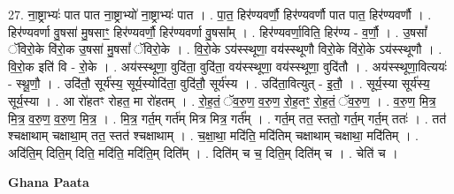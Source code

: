 \documentclass[17pt]{extarticle}
\begin{document}
27. ना॒ष्ट्राभ्यः॑ पात पात ना॒ष्ट्राभ्यो॑ ना॒ष्ट्राभ्यः॑ पात । . पा॒त॒ हिर॑ण्यवर्णौ॒ हिर॑ण्यवर्णौ पात पात॒ हिर॑ण्यवर्णौ । . हिर॑ण्यवर्णा वु॒षसा॑ मु॒षसाꣳ॒॒ हिर॑ण्यवर्णौ॒ हिर॑ण्यवर्णा वु॒षसा᳚म् । . हिर॑ण्यवर्णा॒विति॒ हिर॑ण्य - व॒र्णौ॒ । . उ॒षसां᳚ ॅविरो॒के वि॑रो॒क उ॒षसा॑ मु॒षसां᳚ ॅविरो॒के । . वि॒रो॒के ऽय॑स्स्थूणा॒ वय॑स्स्थूणौ विरो॒के वि॑रो॒के ऽय॑स्स्थूणौ । . वि॒रो॒क इति॑ वि - रो॒के । . अय॑स्स्थूणा॒ वुदि॑ता॒ वुदि॑ता॒ वय॑स्स्थूणा॒ वय॑स्स्थूणा॒ वुदि॑तौ । . अय॑स्स्थूणा॒वित्ययः॑ - स्थू॒णौ॒ । . उदि॑तौ॒ सूर्य॑स्य॒ सूर्य॒स्योदि॑ता॒ वुदि॑तौ॒ सूर्य॑स्य । . उदि॑ता॒वित्युत् - इ॒तौ॒ । . सूर्य॒स्या सूर्य॑स्य॒ सूर्य॒स्या । . आ रो॑हतꣳ रोहत॒ मा रो॑हतम् । . रो॒ह॒तं॒ ॅव॒रु॒ण॒ व॒रु॒ण॒ रो॒ह॒तꣳ॒॒ रो॒ह॒तं॒ ॅव॒रु॒ण॒ । . व॒रु॒ण॒ मि॒त्र॒ मि॒त्र॒ व॒रु॒ण॒ व॒रु॒ण॒ मि॒त्र॒ । . मि॒त्र॒ गर्त॒म् गर्त॑म् मित्र मित्र॒ गर्त᳚म् । . गर्त॒म् तत॒ स्ततो॒ गर्त॒म् गर्त॒म् ततः॑ । . तत॑ श्चक्षाथाम् चक्षाथा॒म् तत॒ स्तत॑ श्चक्षाथाम् । . च॒क्षा॒था॒ मदि॑ति॒ मदि॑तिम् चक्षाथाम् चक्षाथा॒ मदि॑तिम् । . अदि॑ति॒म् दिति॒म् दिति॒ मदि॑ति॒ मदि॑ति॒म् दिति᳚म् । . दिति॑म् च च॒ दिति॒म् दिति॑म् च । . चेति॑ च । \newline

\textbf{Ghana Paata } \newline
\end{document}
